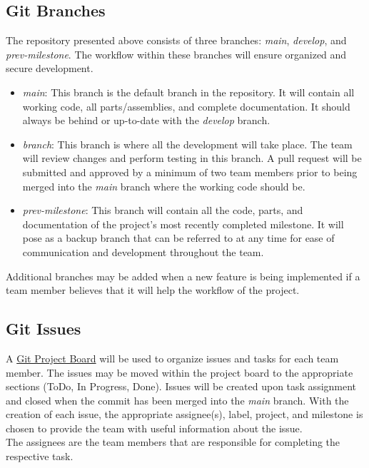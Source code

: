 \documentclass{article}
\begin{document}
	\subsection{Git Branches}
	The repository presented above consists of three branches: \emph{main}, \emph{develop}, and \emph{prev-milestone}. 
	The workflow within these branches will ensure organized and secure development.
	\begin{itemize}
		\item \emph{main}: This branch is the default branch in the repository. It will contain all working code, all parts/assemblies, and complete documentation. 
		It should always be behind or up-to-date with the \emph{develop} branch.
		\item \emph{branch}: This branch is where all the development will take place.
		 The team will review changes and perform testing in this branch. A pull request 
		 will be submitted and approved by a minimum of two team members prior to being 
		 merged into the \emph{main} branch where the working code should be.
		\item \emph{prev-milestone}: This branch will contain all the code, parts, and documentation 
		of the project’s most recently completed milestone. It will pose as a 
		backup branch that can be referred to at any time for ease of communication and 
		development throughout the team.
	\end{itemize}
	Additional branches may be added when a new feature is being implemented if a 
	team member believes that it will help the workflow of the project.

	\subsection{Git Issues}
	A \href{https://github.com/users/aaronbilly22/projects/1}{Git Project Board} will be used to organize 
	issues and tasks for each team member. The issues may be moved within the project board to the 
	appropriate sections (ToDo, In Progress, Done). Issues will be created upon task assignment and closed 
	when the commit has been merged into the \emph{main} branch. With the creation of each issue, the appropriate assignee(s), label, project, and milestone is chosen
	to provide the team with useful information about the issue.\\

	\noindent The assignees are the team members that are responsible for completing the respective task.\\
\end{document}
